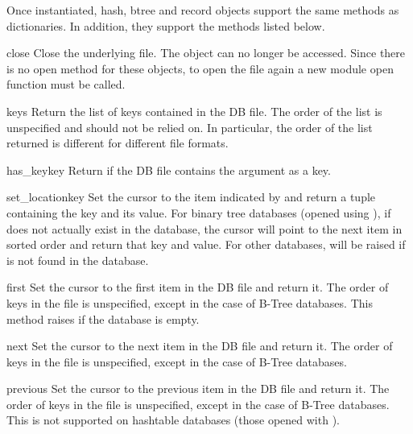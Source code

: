 Once instantiated, hash, btree and record objects support
the same methods as dictionaries.  In addition, they support
the methods listed below.

\begin{methoddesc}{close}{}
Close the underlying file.  The object can no longer be accessed.  Since
there is no open  method for these objects, to open the file
again a new  module open function must be called.
\end{methoddesc}

\begin{methoddesc}{keys}{}
Return the list of keys contained in the DB file.  The order of the list is
unspecified and should not be relied on.  In particular, the order of the
list returned is different for different file formats.
\end{methoddesc}

\begin{methoddesc}{has_key}{key}
Return  if the DB file contains the argument as a key.
\end{methoddesc}

\begin{methoddesc}{set_location}{key}
Set the cursor to the item indicated by  and return a tuple
containing the key and its value.  For binary tree databases (opened
using ), if  does not actually exist in
the database, the cursor will point to the next item in sorted order
and return that key and value.  For other databases,
 will be raised if  is not found in the
database.
\end{methoddesc}

\begin{methoddesc}{first}{}
Set the cursor to the first item in the DB file and return it.  The order of 
keys in the file is unspecified, except in the case of B-Tree databases.
This method raises  if the database is empty.
\end{methoddesc}

\begin{methoddesc}{next}{}
Set the cursor to the next item in the DB file and return it.  The order of 
keys in the file is unspecified, except in the case of B-Tree databases.
\end{methoddesc}

\begin{methoddesc}{previous}{}
Set the cursor to the previous item in the DB file and return it.  The
order of keys in the file is unspecified, except in the case of B-Tree
databases.  This is not supported on hashtable databases (those opened
with ).
\end{methoddesc}


